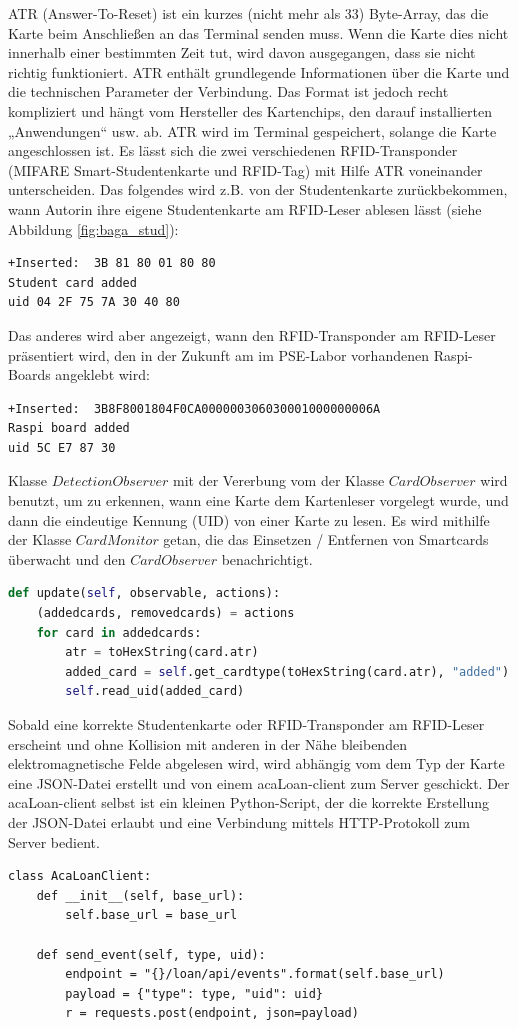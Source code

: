 ATR (Answer-To-Reset) ist ein kurzes (nicht mehr als 33) Byte-Array, das die Karte beim Anschließen an das Terminal senden muss. Wenn die Karte dies nicht innerhalb einer bestimmten Zeit tut, wird davon ausgegangen, dass sie nicht richtig funktioniert. ATR enthält grundlegende Informationen über die Karte und die technischen Parameter der Verbindung. Das Format ist jedoch recht kompliziert und hängt vom Hersteller des Kartenchips, den darauf installierten „Anwendungen“ usw. ab. ATR wird im Terminal gespeichert, solange die Karte angeschlossen ist. Es lässt sich die zwei verschiedenen RFID-Transponder (MIFARE Smart-Studentenkarte und RFID-Tag) mit Hilfe ATR voneinander unterscheiden. Das folgendes wird z.B. von der Studentenkarte zurückbekommen, wann Autorin ihre eigene Studentenkarte am RFID-Leser ablesen lässt (siehe Abbildung \ref{fig:baga_stud}):
\begin{lstlisting}
+Inserted:  3B 81 80 01 80 80
Student card added
uid 04 2F 75 7A 30 40 80
\end{lstlisting}

Das anderes wird aber angezeigt, wann den RFID-Transponder am RFID-Leser präsentiert wird, den in der Zukunft am im PSE-Labor vorhandenen Raspi-Boards angeklebt wird:
\begin{lstlisting}
+Inserted:  3B8F8001804F0CA000000306030001000000006A
Raspi board added
uid 5C E7 87 30
\end{lstlisting}

Klasse $DetectionObserver$ mit der Vererbung vom der Klasse $CardObserver$ wird benutzt, um zu erkennen, wann eine Karte dem Kartenleser vorgelegt wurde, und dann die eindeutige Kennung (UID) von einer Karte zu lesen. Es wird mithilfe der Klasse $ CardMonitor$ getan, die das Einsetzen / Entfernen von Smartcards überwacht und den $CardObserver$ benachrichtigt. 
\begin{lstlisting}[language=Python]
def update(self, observable, actions):
	(addedcards, removedcards) = actions
	for card in addedcards:
		atr = toHexString(card.atr)
		added_card = self.get_cardtype(toHexString(card.atr), "added")
		self.read_uid(added_card)
\end{lstlisting}

Sobald eine korrekte Studentenkarte oder RFID-Transponder am RFID-Leser erscheint und ohne Kollision mit anderen in der Nähe bleibenden elektromagnetische Felde abgelesen wird, wird abhängig vom dem Typ der Karte eine JSON-Datei erstellt und von einem acaLoan-client zum Server geschickt. Der acaLoan-client selbst ist ein kleinen Python-Script, der die korrekte Erstellung der JSON-Datei erlaubt und eine Verbindung mittels HTTP-Protokoll zum Server bedient. 
\begin{lstlisting}
class AcaLoanClient:
	def __init__(self, base_url):
		self.base_url = base_url
	
	def send_event(self, type, uid):
		endpoint = "{}/loan/api/events".format(self.base_url)
		payload = {"type": type, "uid": uid}
		r = requests.post(endpoint, json=payload)
\end{lstlisting}

